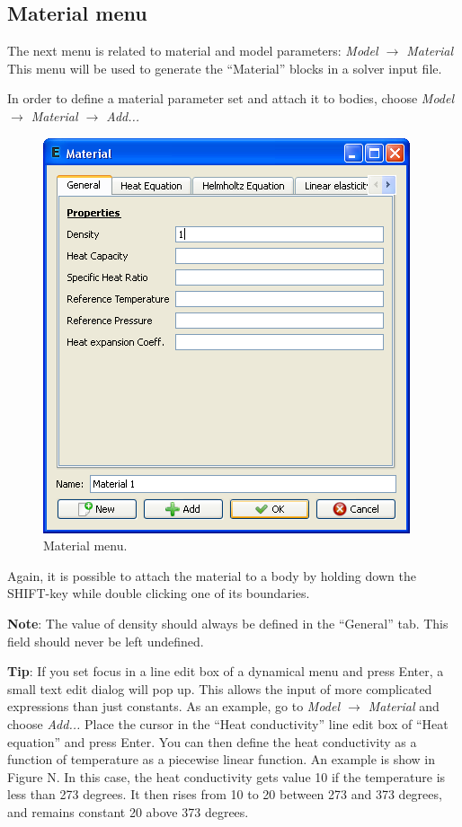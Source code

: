 \documentclass[a4paper,12pt]{article}
\newcommand{\menu}[2]{{\it \vskip2mm #1 $\rightarrow$ #2 \vskip2mm}}
\newcommand{\dynmenu}[3]{{\it \vskip2mm #1 $\rightarrow$ #2 $\rightarrow$ #3 \vskip2mm}}
\begin{document}
\subsection{Material menu}

The next menu is related to material and model parameters:
\menu{Model}{Material}
\noindent This menu will be used to generate the ``Material'' blocks in a solver
input file.

In order to define a material parameter set and attach it to bodies, choose
\dynmenu{Model}{Material}{Add...}
\noindent 

\begin{figure}[ht]
\begin{center}
 \includegraphics[scale=0.5]{images/material.png}
\caption{Material menu.}
\end{center}
\end{figure}

Again, it is possible to attach the material to a body by holding down the SHIFT-key while double clicking one of its boundaries.

\vskip2mm

{\bf Note}: The value of density should always be defined in the ``General'' tab. This
field should never be left undefined.

\vskip2mm

{\bf Tip}: If you set focus in a line edit box of a dynamical menu and press Enter, a small
text edit dialog will pop up. This allows the input of more complicated expressions
than just constants. As an example, go to {\it Model $\rightarrow$ Material} and choose
{\it Add...} Place the cursor in the ``Heat conductivity'' line edit box of ``Heat
equation'' and press Enter. You can then define the heat conductivity
as a function of temperature as a piecewise linear function. An example is show in
Figure N. In this case, the heat conductivity gets value 10 if the temperature is less
than 273 degrees. It then rises from 10 to 20 between 273 and 373 degrees, and
remains constant 20 above 373 degrees.
\end{document}
